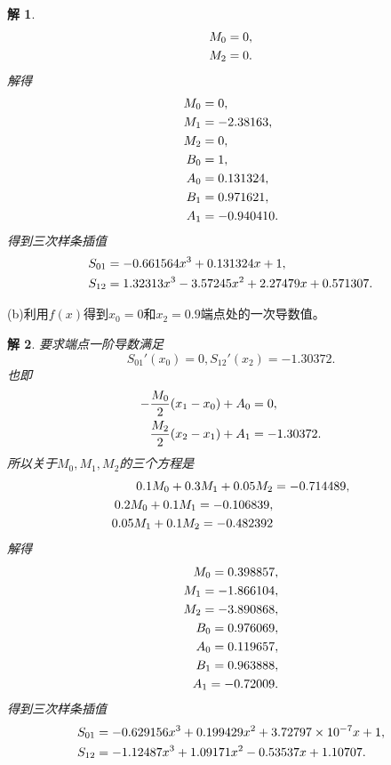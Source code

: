 \documentclass[10pt]{ctexart}
\newtheorem*{solution}{解}
\begin{document}
\begin{solution}
\begin{align}
        M_0&=0,\notag\\
        M_2&=0.\notag
    \end{align}
    解得
    \begin{align}
    M_0&=0,\notag\\
    M_1&=-2.38163,\notag\\
    M_2&=0,\notag\\
    B_0&=1,\notag\\
    A_0&=0.131324,\notag\\
    B_1&=0.971621,\notag\\
    A_1&=-0.940410.\notag
    \end{align}
    得到三次样条插值
    \begin{align}
    S_{01}&=-0.661564x^3+0.131324 x+1,\notag\\
    S_{12}&=1.32313x^3-3.57245 x^2+2.27479 x+0.571307 .\notag
    \end{align}
\end{solution}
(b)利用$f(x)$得到$x_0=0$和$x_2=0.9$端点处的一次导数值。
\begin{solution}
    要求端点一阶导数满足
    $$S_{01}'(x_0)=0,S_{12}'(x_2)=-1.30372.$$
    也即
    \begin{align}
        -\frac{M_0}{2}(x_1-x_0)+A_0&=0,\notag\\
        \frac{M_2}{2}(x_2-x_1)+A_1&=-1.30372.\notag
    \end{align}
    所以关于$M_0,M_1,M_2$的三个方程是
    \begin{align}
        0.1M_0+0.3M_1+0.05M_2&=-0.714489,\notag\\
        0.2M_0+0.1M_1=-0.106839,\notag\\
        0.05M_1+0.1M_2=-0.482392\notag
    \end{align}
    解得
    \begin{align}
        M_0=0.398857,\notag\\
        M_1=-1.866104,\notag\\
        M_2=-3.890868,\notag\\
        B_0=0.976069,\notag\\
        A_0=0.119657,\notag\\
        B_1=0.963888,\notag\\
        A_1=-0.72009.\notag
    \end{align}
    得到三次样条插值
    \begin{align}
        S_{01}&=-0.629156 x^3+0.199429 x^2+ 3.72797\times 10^{-7}x +1,\notag\\
        S_{12}&=-1.12487 x^3+1.09171 x^2 -0.53537 x+1.10707.\notag
    \end{align}
\end{solution}
\end{document}
